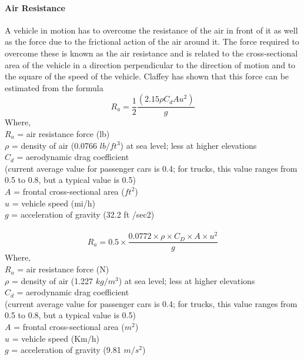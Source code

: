 \paragraph{Air Resistance}
A vehicle in motion has to overcome the resistance of the air in front of it as well as the force due to the frictional action of the air around it. The force required to overcome these is known as the air resistance and is related to the cross-sectional area of the vehicle in a direction perpendicular to the direction of motion and to the square of the speed of the vehicle. Claffey has shown that this force can be estimated from the formula
\begin{equation}
	R_a = \frac{1}{2}\frac{(2.15\rho C_d A u^2)}{g}
\end{equation}
Where,\\
\hspace*{10mm}$R_a$ = air resistance force (lb)\\
\hspace*{10mm}$\rho$ = density of air (0.0766 $ lb/ft^3 $) at sea level; less at higher elevations\\
\hspace*{10mm}$C_d$ = aerodynamic drag coefficient\\
\hspace*{10mm}(current average value for passenger cars is 0.4; for trucks, this value ranges from 0.5 to 0.8, but a typical value is 0.5)\\
\hspace*{10mm}$A$ = frontal cross-sectional area ($ ft^2 $)\\
\hspace*{10mm}$u$ = vehicle speed (mi/h)\\
\hspace*{10mm}$g$ = acceleration of gravity (32.2 ft /sec2)\\\\
\begin{equation}
	R_a = 0.5 \times \frac{0.0772 \times \rho \times C_D \times A \times u^2}{g}
\end{equation}
Where,\\
\hspace*{10mm}$R_a$ = air resistance force (N)\\
\hspace*{10mm}$\rho$ = density of air (1.227 $ kg/m^3 $) at sea level; less at higher elevations\\
\hspace*{10mm}$C_d$ = aerodynamic drag coefficient\\
\hspace*{10mm}(current average value for passenger cars is 0.4; for trucks, this value ranges from 0.5 to 0.8, but a typical value is 0.5)\\
\hspace*{10mm}$A$ = frontal cross-sectional area ($ m^2 $)\\
\hspace*{10mm}$u$ = vehicle speed (Km/h)\\
\hspace*{10mm}$g$ = acceleration of gravity (9.81 $ m/s^2 $)
